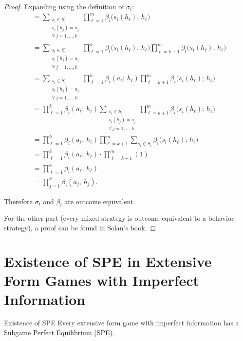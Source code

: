 \documentclass[12pt, a4paper]{article}
\begin{document}
\begin{proof}
Expanding using the definition of $\sigma_i$:
\begin{align*}
  &= \sum_{\substack{s_i \in S_i \\ s_i(h_j) = a_j \\ \forall\, j = 1,\ldots,k}}
     \prod_{\ell=1}^{m} \beta_i\!\bigl(s_i(h_\ell),\, h_\ell\bigr) \\[6pt]
  &= \sum_{\substack{s_i \in S_i \\ s_i(h_j) = a_j \\ \forall\, j = 1,\ldots,k}}
     \prod_{\ell=1}^{k} \beta_i\!\bigl(s_i(h_\ell),\, h_\ell\bigr)
     \prod_{\ell=k+1}^{m} \beta_i\!\bigl(s_i(h_\ell),\, h_\ell\bigr) \\[6pt]
  &= \sum_{\substack{s_i \in S_i \\ s_i(h_j) = a_j \\ \forall\, j = 1,\ldots,k}}
     \prod_{\ell=1}^{k} \beta_i(a_\ell;\, h_\ell)
     \prod_{\ell=k+1}^{m} \beta_i\!\bigl(s_i(h_\ell);\, h_\ell\bigr) \\[6pt]
  &= \prod_{\ell=1}^{k} \beta_i(a_\ell;\, h_\ell)
     \sum_{\substack{s_i \in S_i \\ s_i(h_j) = a_j \\ \forall\, j = 1,\ldots,k}}
     \prod_{\ell=k+1}^{m} \beta_i\!\bigl(s_i(h_\ell);\, h_\ell\bigr) \\[6pt]
  &= \prod_{\ell=1}^{k} \beta_i(a_\ell;\, h_\ell)
     \prod_{\ell=k+1}^{m} \sum_{s_i \in S_i} \beta_i\!\bigl(s_i(h_\ell);\, h_\ell\bigr) \\[6pt]
  &= \prod_{\ell=1}^{k} \beta_i(a_\ell;\, h_\ell) \cdot \prod_{\ell=k+1}^{m} (1) \\[6pt]
  &= \prod_{\ell=1}^{k} \beta_i(a_\ell;\, h_\ell) \\[4pt]
  &= \prod_{j=1}^{k} \beta_i(a_j,\, h_j).
\end{align*}

Therefore $\sigma_i$ and $\beta_i$ are outcome equivalent.

\medskip
For the other part (every mixed strategy is outcome equivalent to a behavior strategy), a proof can be found in Solan's book.
\end{proof}

\section{Existence of SPE in Extensive Form Games with Imperfect Information}

\begin{thmbox}{Existence of SPE}
Every extensive form game with imperfect information has a Subgame Perfect Equilibrium (SPE).
\end{thmbox}
\end{document}
